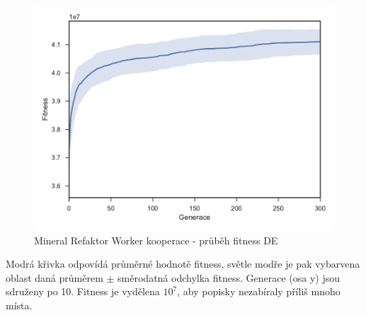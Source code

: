 \clearpage
\begin{figure}[h]\centering
	\includegraphics[width=\columnwidth]{../img/MineralMap/MineralFullCoop}
	\caption{Mineral Refaktor Worker kooperace -  průběh fitness DE}
	\label{obr04:MineralFullCoop}
\end{figure}
Modrá křivka odpovídá průměrné hodnotě fitness, světle modře je pak vybarvena oblast daná průměrem $\pm$ směrodatná odchylka fitness. Generace (osa y) jsou sdruženy po 10. Fitness je vydělena $10^7$, aby popisky nezabíraly příliš mnoho místa. 
\clearpage
